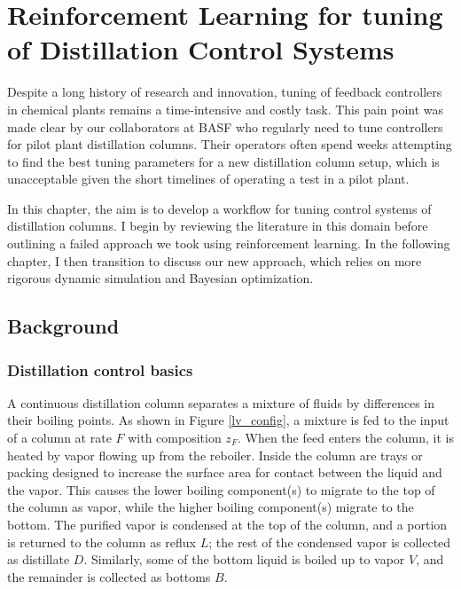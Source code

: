 \chapter{Reinforcement Learning for tuning of  Distillation Control Systems}\label{ch:rl_tuning} 
Despite a long history of research and innovation, tuning of feedback controllers in chemical plants remains a time-intensive and costly task. This pain point was made clear by our collaborators at BASF who regularly need to tune controllers for pilot plant distillation columns. Their operators often spend weeks attempting to find the best tuning parameters for a new distillation column setup, which is unacceptable given the short timelines of operating a test in a pilot plant.

In this chapter, the aim is to develop a workflow for tuning control systems of distillation columns. I begin by reviewing the literature in this domain before outlining a failed approach we took using reinforcement learning.  In the following chapter, I then transition to discuss our new approach, which relies on more rigorous dynamic simulation and Bayesian optimization.


\section{Background}


\subsection{Distillation control basics}
A continuous distillation column separates a mixture of fluids by differences in their boiling points. As shown in Figure \ref{lv_config}, a mixture is fed to the input of a column at rate $F$ with composition $z_F$.  When the feed enters the column, it is heated by vapor flowing up from the reboiler. Inside the column are trays or packing designed to increase the surface area for contact between the liquid and the vapor. This causes the lower boiling component(s) to migrate to the top of the column as vapor, while the higher boiling component(s) migrate to the bottom. The purified vapor is condensed at the top of the column, and a portion is returned to the column as reflux $L$; the rest of the condensed vapor is collected as distillate $D$. Similarly, some of the bottom liquid is boiled up to vapor $V$, and the remainder is collected as bottoms $B$.

